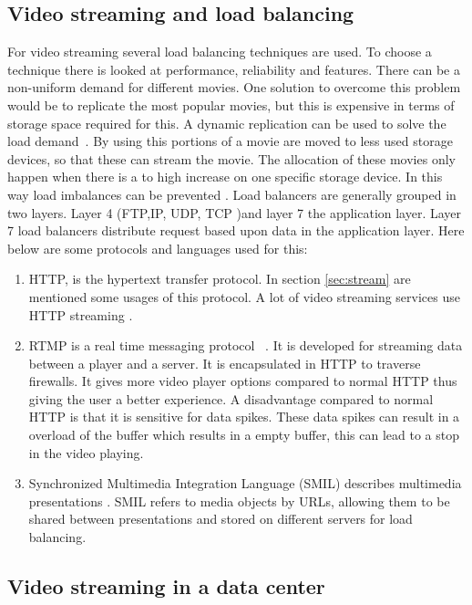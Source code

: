 \documentclass{sig-alternate-br}
\begin{document}
\subsection{Video streaming and load balancing}
For video streaming several load balancing techniques are used. To choose a technique there is looked at performance, reliability and features. There can be a non-uniform demand for different movies. One solution to overcome this problem would be to replicate the most popular movies, but this is expensive in terms of storage space required for this. A dynamic replication can be used to solve the load demand~\cite{dan1996load}. By using this  portions of a movie are moved to less used storage devices, so that these can stream the movie. The allocation of these movies only happen when there is a to high increase on one specific storage device. In this way load imbalances can be prevented \cite{dan1996load}. \newline
Load balancers are generally grouped in two layers. Layer 4 (FTP,IP, UDP, TCP )and layer 7 the application layer. Layer 7 load balancers distribute request based upon data in the application layer. Here below are some protocols and languages used for this:
\begin{enumerate}[topsep=0pt,itemsep=-1ex,partopsep=1ex,parsep=1ex]
	\item HTTP, is the hypertext transfer protocol. In section \ref{sec:stream} are mentioned some usages of this protocol. A lot of video streaming services use HTTP streaming \cite{Adhikari:2012}.  
	\item RTMP is a real time messaging protocol ~\cite{rtmp}. It is developed for streaming data between a player and a server. It is encapsulated in HTTP to traverse firewalls. It gives more video player options compared to normal HTTP thus giving the user a better experience. A disadvantage compared to normal HTTP is that it is sensitive for data spikes. These data spikes can result in a overload of the buffer which results in a empty buffer, this can lead to a stop in the video playing. 
	\item Synchronized Multimedia Integration Language (SMIL) describes multimedia presentations \cite{smil}. SMIL refers to media objects by URLs, allowing them to be shared between presentations and stored on different servers for load balancing. 
\end{enumerate}


\subsection{Video streaming in a data center}
\end{document}
